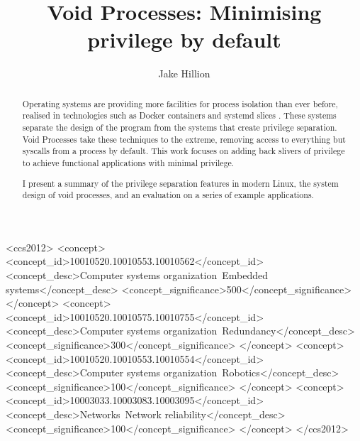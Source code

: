 \documentclass[sigplan]{acmart}
\begin{document}
\title[Void Processes]{Void Processes: Minimising privilege by default}

\author{Jake Hillion}


\begin{abstract}
Operating systems are providing more facilities for process isolation than ever before, realised in technologies such as Docker containers \citep{merkel_docker_2014} and systemd slices \citep{the_systemd_authors_systemdslice_2022}. These systems separate the design of the program from the systems that create privilege separation. Void Processes take these techniques to the extreme, removing access to everything but syscalls from a process by default. This work focuses on adding back slivers of privilege to achieve functional applications with minimal privilege.

I present a summary of the privilege separation features in modern Linux, the system design of void processes, and an evaluation on a series of example applications. 
\end{abstract}

\begin{CCSXML}
<ccs2012>
 <concept>
  <concept_id>10010520.10010553.10010562</concept_id>
  <concept_desc>Computer systems organization~Embedded systems</concept_desc>
  <concept_significance>500</concept_significance>
 </concept>
 <concept>
  <concept_id>10010520.10010575.10010755</concept_id>
  <concept_desc>Computer systems organization~Redundancy</concept_desc>
  <concept_significance>300</concept_significance>
 </concept>
 <concept>
  <concept_id>10010520.10010553.10010554</concept_id>
  <concept_desc>Computer systems organization~Robotics</concept_desc>
  <concept_significance>100</concept_significance>
 </concept>
 <concept>
  <concept_id>10003033.10003083.10003095</concept_id>
  <concept_desc>Networks~Network reliability</concept_desc>
  <concept_significance>100</concept_significance>
 </concept>
</ccs2012>
\end{CCSXML}
\end{document}

